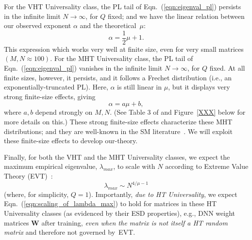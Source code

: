 
For the VHT Universality class, the PL tail of Eqn.~(\ref{eqn:eigenval_pl}) persists in the infinite limit $N\rightarrow\infty$, for $Q$ fixed; and
we have the linear relation between our observed exponent $\alpha$ and the theoretical~$\mu$:
\begin{equation}
\alpha=\frac{1}{2}\mu+1  .
\label{eqn:alpha_mu_vht}
\end{equation}
This expression which works very well at finite size, even for very small matrices $(M,N\approx100)$.
%
For the MHT Universality class, the PL tail of Eqn.~(\ref{eqn:eigenval_pl}) vanishes in the infinite limit $N\rightarrow\infty$, for $Q$ fixed.
At all finite sizes, however, it persists, and it follows a Frechet distribution (i.e., an exponentially-truncated PL). 
Here, $\alpha$ is still linear in $\mu$, but it displays very strong finite-size effects, giving 
\begin{equation}
\alpha=a\mu+b, 
\label{eqn:alpha_mu_mht}
\end{equation}
where $a,b$ depend strongly on $M,N$. 
(See Table 3 of \cite{MM18_TR} and Figure~\ref{XXX} below for more details on this.)
These strong finite-size effects characterize these MHT distributions; and they are well-known in the SM literature~\cite{SornetteBook,BouchaudPotters03}. 
We will exploit these finite-size effects to develop our-theory.

Finally, for both the VHT and the MHT Universality classes, we expect the maximum empirical eigenvalue, $\lambda_{max}$, to scale with $N$
according to Extreme Value Theory (EVT)~\cite{heavytails2007,Resnick07,MM18_TR}:
\begin{equation}
\lambda_{max}\sim N^{4/\mu-1}  
\label{eqn:scaling_of_lambda_max}
\end{equation}
(where, for simplicity, $Q=1$).
Importantly, \emph{due to HT Universality}, we expect Eqn.~(\ref{eqn:scaling_of_lambda_max}) to hold for matrices in these HT Universality classes (as evidenced by their ESD properties), e.g., DNN weight matrices $\mathbf{W}$ after training, \emph{even when the matrix is not itself a HT random matrix} and therefore not governed by~EVT.



